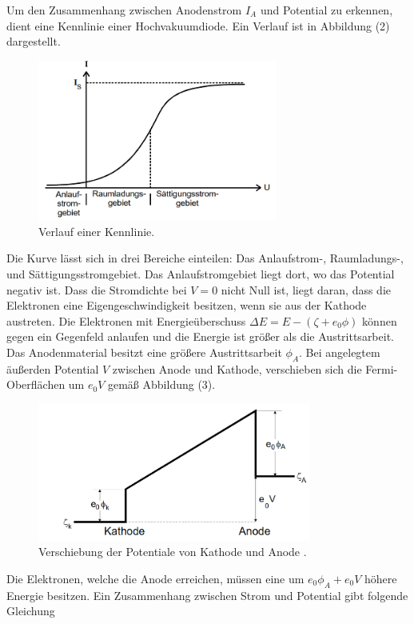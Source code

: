 Um den Zusammenhang zwischen Anodenstrom $I_A$ und Potential zu erkennen, dient eine Kennlinie einer Hochvakuumdiode. Ein Verlauf ist in Abbildung (2) dargestellt.
\begin{figure}[H]
  \centering
  \includegraphics[width=0.7\textwidth]{k.png}
  \caption{Verlauf einer Kennlinie\cite{kent}.}
  \label{fig:aufbau}
\end{figure}
Die Kurve lässt sich in drei Bereiche einteilen: Das Anlaufstrom-, Raumladungs-, und Sättigungsstromgebiet. Das Anlaufstromgebiet liegt dort, wo das Potential negativ ist.
Dass die Stromdichte bei $V=0$ nicht Null ist, liegt daran, dass die Elektronen eine Eigengeschwindigkeit besitzen, wenn sie aus der Kathode austreten. Die Elektronen mit Energieüberschuss $\Delta E = E - ( \zeta + e_0 \phi)$ können gegen ein Gegenfeld anlaufen und die Energie ist größer als die Austrittsarbeit.
Das Anodenmaterial besitzt eine größere Austrittsarbeit $\phi_A$. Bei angelegtem äußerden Potential $V$ zwischen Anode und Kathode, verschieben sich die Fermi-Oberflächen um $e_0V$ gemäß Abbildung (3).
\begin{figure}[H]
  \centering
  \includegraphics[width=0.8\textwidth]{blah.png}
  \caption{Verschiebung der Potentiale von Kathode und Anode \cite{kent}.}
  \label{fig:aufbau}
\end{figure}
Die Elektronen, welche die Anode erreichen, müssen eine um $e_0 \phi_A + e_0 V$ höhere Energie besitzen. Ein Zusammenhang zwischen Strom und Potential gibt folgende Gleichung
